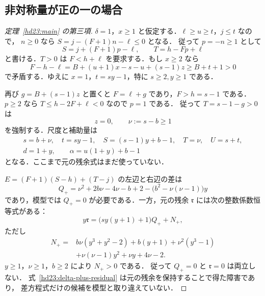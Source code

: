 \subsection{非対称量が正の一の場合}

\begin{proof}[定理~\ref{hd23:main} の第三項]
$\delta=1$，$x\ge1$ と仮定する．$\ell\ge u\ge t$，$j\le t$ なので，
$n\ge0$ なら $S=j-(F+1)n-\ell\le0$ となる．
従って $p=-n\ge1$ として
\[
 S=j+(F+1)p-\ell,\qquad T=h-Fp+\ell
\]
と書ける．$T>0$ は $F<h+\ell$ を要求する．もし $x\ge2$ なら
\[
 F-h-\ell=B+(u+1)x-s-u+(s-1)z\ge B+t+1>0
\]
で矛盾する．ゆえに $x=1$，$t=sy-1$，特に $s\ge2,y\ge1$ である．

再び $g=B+(s-1)z$ と置くと $F=\ell+g$ であり，$F>h=s-1$ である．
$p\ge2$ なら $T\le h-2F+\ell<0$ なので $p=1$ である．
従って $T=s-1-g>0$ は
\[
 z=0,\qquad \nu:=s-b\ge1
\]
を強制する．尺度と補助量は
\begin{equation}\label{hd23:delta-plus-data}
 \begin{gathered}
 s=b+\nu,\quad t=sy-1,\quad
 S=(s-1)y+b-1,\quad T=\nu,\quad U=s+t,\\
 d=1+y,\qquad \alpha=u(1+y)+b-1
 \end{gathered}
\end{equation}
となる．ここまで元の残余式はまだ使っていない．

$E=(F+1)(S-h)+(T-j)$ の左辺と右辺の差は
\begin{equation}\label{hd23:delta-plus-Q}
 Q_+=\nu^2+2b\nu-4\nu-b+2
       -\bigl(b^2-\nu(\nu-1)\bigr)y
\end{equation}
であり，模型では $Q_+=0$ が必要である．一方，元の残余
$\mathfrak r$ には次の整数係数恒等式がある：
\begin{equation}\label{hd23:delta-plus-residual}
 y\mathfrak r=\bigl(sy(y+1)+1\bigr)Q_++N_+,
\end{equation}
ただし
\begin{equation}\label{hd23:N-positive}
 \begin{aligned}
 N_+={}&b\nu(y^3+y^2-2)+b(y+1)+\nu^2(y^3-1)\\
       &+\nu(\nu-1)y^2+\nu y+4\nu-2.
 \end{aligned}
\end{equation}
$y\ge1$，$\nu\ge1$，$b\ge2$ により $N_+>0$ である．
従って $Q_+=0$ と $\mathfrak r=0$ は両立しない．
式~\eqref{hd23:delta-plus-residual} は元の残余を保持することで得た障害であり，
差方程式だけの候補を模型と取り違えていない．
\end{proof}

